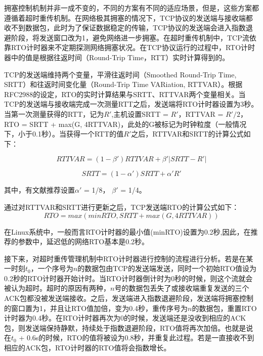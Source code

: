 拥塞控制机制并非一成不变的，不同的方案有不同的适应场景，但是，这些方案都遵循着超时重传机制。在网络极其拥塞的情况下，TCP协议的发送端与接收端都收不到数据包，此时为了保证数据稳定的传输，TCP协议的发送端会进入指数退避阶段，将发送窗口改为1，避免网络进一步拥塞。在超时重传机制中，TCP流依靠RTO计时器来不定期探测网络拥塞状况。在TCP协议运行的过程中，RTO计时器中的值是根据往返时间（Round-Trip Time，RTT）实时计算得到的。

TCP的发送端维持两个变量，平滑往返时间（Smoothed Round-Trip Time, SRTT）和往返时间变化量（Round-Trip Time VARiation, RTTVAR）。根据RFC2988\cite{2000Computing}的设定，RTO的实时计算结果与SRTT、RTTVAR两个变量相关。当TCP的发送端与接收端完成一次测量RTT之后，发送端将RTO计时器设置为3秒。
当第一次测量获得的RTT，记为$R'$,主机设置SRTT = $R'$，RTTVAR = $R' / 2$，RTO = SRTT + max(G, 4RTTVAR)，此处的G被标记为时钟粒度（一般情况下，小于0.1秒）。当获得一个RTT的值$R'$之后，RTTVAR和SRTT的计算公式如下：



\vspace{-0.3in}
\begin{equation}
    \label{equ:rttvar}
    RTTVAR = (1 - \beta ') RTTVAR + \beta ' |SRTT - R'|
\end{equation}

\vspace{-0.5in}
\begin{equation}
    \label{equ:srtt}
    SRTT = (1 - \alpha ') SRTT + \alpha ' R'
\end{equation}

其中，有文献\cite{Jacobson1988Congestion}推荐设置$\alpha '$ = 1/8， $\beta '$ = 1/4。


通过对RTTVAR和SRTT进行更新之后，TCP发送端RTO的计算公式如下：
\vspace{-0.1in}
\begin{equation}
    \label{equ:rto}
    RTO = max(minRTO, SRTT + max(G,4RTTVAR))
\end{equation}

在Linux系统中，一般而言RTO计时器的最小值(minRTO)设置为0.2秒,因此，在推荐的参数中，延迟低的网络RTO基本是0.2秒。

接下来，对超时重传管理机制中RTO计时器进行控制的流程进行分析。若是在某一时刻$t_0$，一个序号为$n$的数据包由TCP的发送端发送，同时一个初始RTO值设为0.2秒的RTO计时器开始计时。当RTO计时器倒计时为0秒的时候，则这个流就会被认为超时。超时的原因有两种，$n$号的数据包丢失了或接收端重复发送的三个ACK包都没被发送端接收。之后，发送端进入指数退避阶段，发送端将拥塞控制的窗口置为1，并且让RTO值加倍，变为0.4秒，重传序号为$n$的数据包，重置RTO计时器为0.4秒。在RTO计时器再次为0的时候，发送端还是没收到相应的ACK包，则发送端保持静默，持续处于指数退避阶段，RTO值将再次加倍。也就是说在$t_0$ + 0.6s的时候，RTO的值将被设为0.8秒，并重复此过程。若是一直接收不到相应的ACK包，RTO计时器的RTO值将会指数增长。


